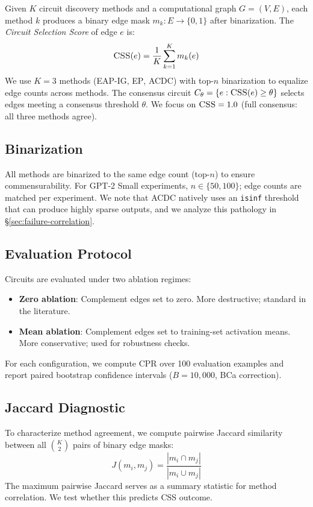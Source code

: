 \documentclass[11pt,a4paper]{article}
\newcommand{\css}{\textsc{CSS}}
\newcommand{\cpr}{\textsc{CPR}}
\newcommand{\eapig}{\textsc{EAP-IG}}
\newcommand{\acdc}{\textsc{ACDC}}
\newcommand{\ep}{\textsc{EP}}
\begin{document}
Given $K$ circuit discovery methods and a computational graph $G=(V,E)$, each method $k$ produces a binary edge mask $m_k: E \to \{0,1\}$ after binarization. The \emph{Circuit Selection Score} of edge $e$ is:
\begin{equation}
    \css{}(e) = \frac{1}{K}\sum_{k=1}^{K} m_k(e)
\end{equation}
We use $K{=}3$ methods (\eapig{}, \ep{}, \acdc{}) with top-$n$ binarization to equalize edge counts across methods. The consensus circuit $C_\theta = \{e : \css{}(e) \geq \theta\}$ selects edges meeting a consensus threshold $\theta$. We focus on $\css{}=1.0$ (full consensus: all three methods agree).

\subsection{Binarization}
All methods are binarized to the same edge count (top-$n$) to ensure commensurability. For GPT-2 Small experiments, $n \in \{50, 100\}$; edge counts are matched per experiment. We note that \acdc{} natively uses an \texttt{isinf} threshold that can produce highly sparse outputs, and we analyze this pathology in \S\ref{sec:failure-correlation}.

\subsection{Evaluation Protocol}
Circuits are evaluated under two ablation regimes:
\begin{itemize}
    \item \textbf{Zero ablation}: Complement edges set to zero. More destructive; standard in the literature.
    \item \textbf{Mean ablation}: Complement edges set to training-set activation means. More conservative; used for robustness checks.
\end{itemize}
For each configuration, we compute \cpr{} over 100 evaluation examples and report paired bootstrap confidence intervals ($B{=}10{,}000$, BCa correction).

\subsection{Jaccard Diagnostic}
To characterize method agreement, we compute pairwise Jaccard similarity between all $\binom{K}{2}$ pairs of binary edge masks:
\begin{equation}
    J(m_i, m_j) = \frac{|m_i \cap m_j|}{|m_i \cup m_j|}
\end{equation}
The maximum pairwise Jaccard serves as a summary statistic for method correlation. We test whether this predicts \css{} outcome.
\end{document}
